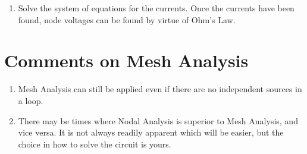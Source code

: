 \documentclass[12 pt,letterpaper]{article}
\begin{document}
\begin{enumerate}
\begin{itemize}
	\end{itemize}
\item Solve the system of equations for the currents. Once the currents have been found, node voltages can be found by virtue of Ohm's Law.
\end{enumerate}

\section{Comments on Mesh Analysis}
\begin{enumerate}
\item Mesh Analysis can still be applied even if there are no independent sources in a loop.
\item There may be times where Nodal Analysis is superior to Mesh Analysis, and vice versa. It is not always readily apparent which will be easier, but the choice in how to solve the circuit is yours.
\end{enumerate}
\end{document}

